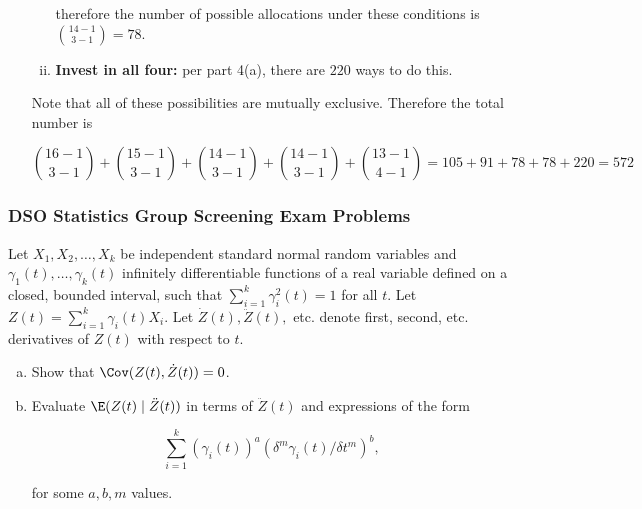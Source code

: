 \begin{enumerate}[(a)]
\begin{enumerate}[(i)]
therefore the number of possible allocations under these conditions is \(\binom{14 - 1}{3 - 1} = \boxed{78} \).

\item \textbf{Invest in all four:} per part 4(a), there are \(\boxed{220}\) ways to do this.

\end{enumerate}

Note that all of these possibilities are mutually exclusive. Therefore the total number is 

\[
\binom{16 - 1}{3 - 1} + \binom{15 - 1}{3 - 1} + \binom{14 - 1}{3 - 1} + \binom{14 - 1}{3 - 1} + \binom{13 - 1}{4 - 1} = 105 + 91 + 78 + 78 + 220 = \boxed{572}
\]

\end{enumerate}

\subsubsection{DSO Statistics Group Screening Exam Problems}

\begin{exercise}

Let \(X_1, X_2, \ldots, X_k\) be independent standard normal random variables and \(\gamma_1(t), \ldots, \gamma_k(t)\) infinitely differentiable functions of a real variable defined on a closed, bounded interval, such that \(\sum_{i=1}^k \gamma_i^2(t) = 1\) for all \(t\). Let \(Z(t) = \sum_{i=1}^k \gamma_i(t) X_i\). Let \(\dot{Z}(t), \ddot{Z}(t),\) etc. denote first, second, etc. derivatives of \(Z(t)\) with respect to \(t\).

\begin{enumerate}[(a)]

\item Show that \(\Cov(Z(t), \dot{Z}(t) ) =0\).

\item Evaluate \(\E(Z(t) \mid \ddot{Z}(t))\) in terms of \(\ddot{Z}(t)\) and expressions of the form

\[
\sum_{i=1}^k (\gamma_i(t))^a (\delta^m \gamma_i(t)/ \delta t^m)^b,
\]

for some \(a, b, m\) values.

\end{enumerate}

\end{exercise}

